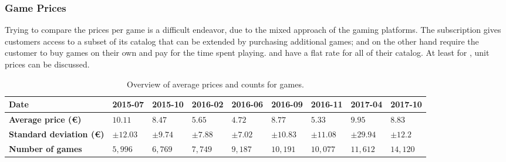 \subsubsection{Game Prices}

Trying to compare the prices per game is a difficult endeavor, due to
the mixed approach of the gaming platforms. The \gfnow subscription
gives customers access to a subset of its catalog that can be
extended by purchasing additional games; \gfnowpc and \liquid
on the other hand require the customer to buy games on their
own and pay for the
time spent playing.
\psnow and \psnowpc have a flat rate for all of their catalog.
At least for \steam, unit prices can be discussed.

\begin{table}
\centering
\caption{Overview of average prices and counts for \steam games.}
\label{tab:steam-price-stats}
\begin{tabu}{X[2]|X[r]X[r]X[r]X[r]X[r]X[r]X[r]X[r]}
	\toprule
	\textbf{Date} & 2015-07 & 2015-10 & 2016-02 & 2016-06 & 2016-09 & 2016-11 & 2017-04 & 2017-10 \\
	\midrule
	\textbf{Average price (€)} & $10.11$ & $8.47$ & $5.65$ & $4.72$ & $8.77$ & $5.33$ & $9.95$ & $8.83$ \\
	\midrule
	\textbf{Standard deviation (€)} & $\pm12.03$ & $\pm9.74$ & $\pm7.88$ & $\pm7.02$ & $\pm10.83$ & $\pm11.08$ & $\pm29.94$ & $\pm12.2$ \\
	\midrule
	\textbf{Number of games} & $5,996$ & $6,769$ & $7,749$ & $9,187$ & $10,191$ & $10,077$ & $11,612$ & $14,120$ \\
	\bottomrule
\end{tabu}
\end{table}




